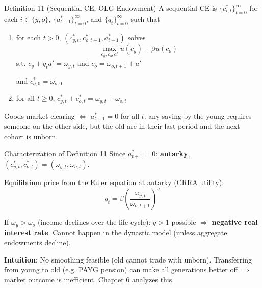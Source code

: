 \documentclass[blue]{beamer}
\begin{document}
\begin{frame}{Definition 11 (Sequential CE, OLG Endowment)}
	A sequential CE is $\{c_{i,t}^*\}_{t=0}^{\infty}$ for each $i \in \{y, o\}$, $\{a_{t+1}^*\}_{t=0}^{\infty}$, and $\{q_t\}_{t=0}^{\infty}$ such that
	
	\begin{enumerate}
		\item for each $t > 0$, $(c_{y,t}^*, c_{o,t+1}^*, a_{t+1}^*)$ solves
		\[
		\max_{c_y, c_o, a'} u(c_y) + \beta u(c_o)
		\]
		s.t. $c_y + q_t a' = \omega_{y,t}$ and $c_o = \omega_{o,t+1} + a'$
		
		and $c_{o,0}^* = \omega_{o,0}$
		
		\item for all $t \geq 0$, $c_{y,t}^* + c_{o,t}^* = \omega_{y,t} + \omega_{o,t}$
	\end{enumerate}
	
	\medskip
	Goods market clearing $\Leftrightarrow$ $a_{t+1}^* = 0$ for all $t$: any saving by the young requires someone on the other side, but the old are in their last period and the next cohort is unborn.
\end{frame}

\begin{frame}{Characterization of Definition 11}
	Since $a_{t+1}^* = 0$: \textbf{autarky}, $(c_{y,t}^*, c_{o,t}^*) = (\omega_{y,t}, \omega_{o,t})$.
	
	\bigskip
	Equilibrium price from the Euler equation at autarky (CRRA utility):
	\[
	q_t = \beta \left(\frac{\omega_{y,t}}{\omega_{o,t+1}}\right)^{\sigma}
	\]
	
	If $\omega_y > \omega_o$ (income declines over the life cycle): $q > 1$ possible $\Rightarrow$ \textbf{negative real interest rate}. Cannot happen in the dynastic model (unless aggregate endowments decline).
	
	\bigskip
	\textbf{Intuition}: No smoothing feasible (old cannot trade with unborn). Transferring from young to old (e.g. PAYG pension) can make all generations better off $\Rightarrow$ market outcome is inefficient. Chapter 6 analyzes this.
\end{frame}
\end{document}
